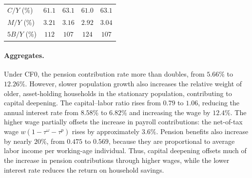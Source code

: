 \documentclass[12pt,a4paper]{article}
\begin{document}
\begin{table}[H]
\begin{tabular}{@{}lcccc@{}}
$C/Y$ (\%)                    & $61.1$  & $63.1$  & $61.0$  & $63.1$  \\
$M/Y$ (\%)                    & $3.21$  & $3.16$  & $2.92$  & $3.04$  \\
$5B/Y$ (\%)                   & $112$   & $107$   & $124$   & $107$   \\
\bottomrule
\end{tabular}
\end{table}

\paragraph{Aggregates.}
Under CF0, the pension contribution rate more than doubles, from $5.66\%$ to $12.26\%$. However, slower population growth also increases the relative weight of older, asset-holding households in the stationary population, contributing to capital deepening. The capital--labor ratio rises from $0.79$ to $1.06$, reducing the annual interest rate from $8.58\%$ to $6.82\%$ and increasing the wage by $12.4\%$. The higher wage partially offsets the increase in payroll contributions: the net-of-tax wage $w(1-\tau^\omega-\tau^p)$ rises by approximately $3.6\%$. Pension benefits also increase by nearly $20\%$, from $0.475$ to $0.569$, because they are proportional to average labor income per working-age individual. Thus, capital deepening offsets much of the increase in pension contributions through higher wages, while the lower interest rate reduces the return on household savings.
\end{document}
